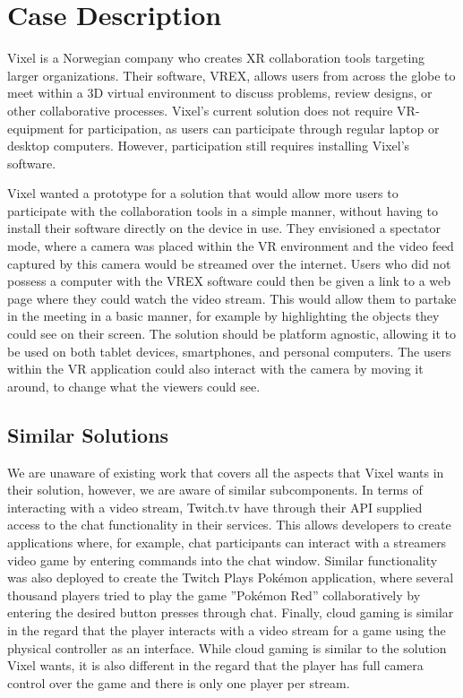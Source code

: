 \section{Case Description}
Vixel\cite{vixel} is a Norwegian company who creates XR collaboration tools targeting larger organizations. Their software, VREX\cite{vrex}, allows users from across the globe to meet within a 3D virtual environment to discuss problems, review designs, or other collaborative processes. Vixel's current solution does not require VR-equipment for participation, as users can participate through regular laptop or desktop computers. However, participation still requires installing Vixel's software. 

Vixel wanted a prototype for a solution that would allow more users to participate with the collaboration tools in a simple manner, without having to install their software directly on the device in use. They envisioned a spectator mode, where a camera was placed within the VR environment and the video feed captured by this camera would be streamed over the internet. Users who did not possess a computer with the VREX software could then be given a link to a web page where they could watch the video stream. This would allow them to partake in the meeting in a basic manner, for example by highlighting the objects they could see on their screen. The solution should be platform agnostic, allowing it to be used on both tablet devices, smartphones, and personal computers. The users within the VR application could also interact with the camera by moving it around, to change what the viewers could see.

\subsection{Similar Solutions}
We are unaware of existing work that covers all the aspects that Vixel wants in their solution, however, we are aware of similar subcomponents. In terms of interacting with a video stream, Twitch.tv have through their API supplied access to the chat functionality in their services. This allows developers to create applications where, for example, chat participants can interact with a streamers video game by entering commands into the chat window\cite{twitch_integration_clustertruck, twitch_integration_details}. Similar functionality was also deployed to create the Twitch Plays Pokémon application, where several thousand players tried to play the game ''Pokémon Red'' collaboratively by entering the desired button presses through chat\cite{twitch_plays_pokemon}. Finally, cloud gaming is similar in the regard that the player interacts with a video stream for a game using the physical controller as an interface. While cloud gaming is similar to the solution Vixel wants, it is also different in the regard that the player has full camera control over the game and there is only one player per stream.    


